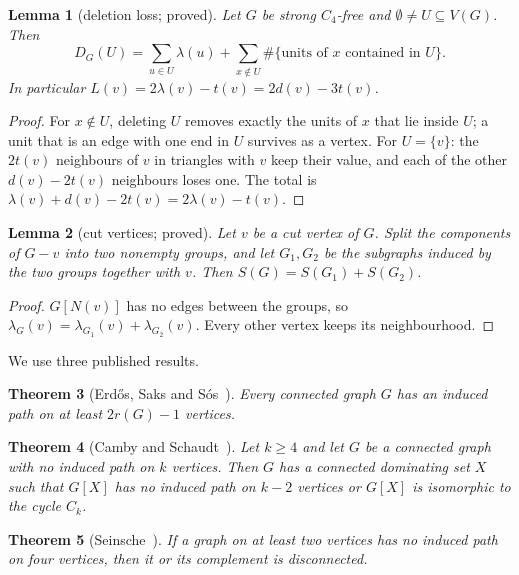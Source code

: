 \documentclass[11pt]{amsart}
\newtheorem{theorem}{Theorem}[section]
\newtheorem{lemma}[theorem]{Lemma}
\theoremstyle{definition}
\theoremstyle{remark}
\begin{document}
\begin{lemma}[deletion loss; proved]\label{lem:loss}
Let $G$ be strong $C_4$-free and $\emptyset\ne U\subseteq V(G)$. Then
\[
D_G(U)=\sum_{u\in U}\lambda(u)+\sum_{x\notin U}\#\{\text{units of }x\text{ contained in }U\}.
\]
In particular $L(v)=2\lambda(v)-t(v)=2d(v)-3t(v)$.
\end{lemma}

\begin{proof}
For $x\notin U$, deleting $U$ removes exactly the units of $x$ that lie inside $U$; a unit that is an edge with one end in $U$ survives as a vertex. For $U=\{v\}$: the $2t(v)$ neighbours of $v$ in triangles with $v$ keep their value, and each of the other $d(v)-2t(v)$ neighbours loses one. The total is $\lambda(v)+d(v)-2t(v)=2\lambda(v)-t(v)$.
\end{proof}

\begin{lemma}[cut vertices; proved]\label{lem:cut}
Let $v$ be a cut vertex of $G$. Split the components of $G-v$ into two nonempty groups, and let $G_1,G_2$ be the subgraphs induced by the two groups together with $v$. Then $S(G)=S(G_1)+S(G_2)$.
\end{lemma}

\begin{proof}
$G[N(v)]$ has no edges between the groups, so $\lambda_G(v)=\lambda_{G_1}(v)+\lambda_{G_2}(v)$. Every other vertex keeps its neighbourhood.
\end{proof}

We use three published results.

\begin{theorem}[Erd\H{o}s, Saks and S\'os~\cite{ess}]\label{thm:ess}
Every connected graph $G$ has an induced path on at least $2r(G)-1$ vertices.
\end{theorem}

\begin{theorem}[Camby and Schaudt~{\cite[Theorem~5]{cs}}]\label{thm:cs}
Let $k\ge4$ and let $G$ be a connected graph with no induced path on $k$ vertices. Then $G$ has a connected dominating set $X$ such that $G[X]$ has no induced path on $k-2$ vertices or $G[X]$ is isomorphic to the cycle $C_k$.
\end{theorem}

\begin{theorem}[Seinsche~\cite{seinsche}]\label{thm:sein}
If a graph on at least two vertices has no induced path on four vertices, then it or its complement is disconnected.
\end{theorem}
\end{document}
